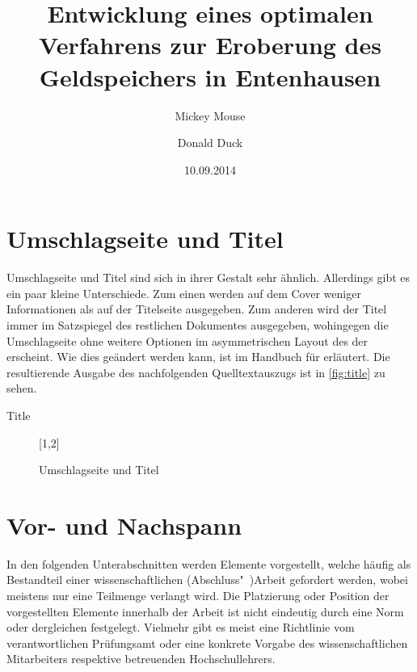 \documentclass[%
  english,ngerman,%
  geometry=no,DIV=12,automark,%
]{tudscrartcl}
\begin{document}
\section{Umschlagseite und Titel}
Umschlagseite und Titel sind sich in ihrer Gestalt sehr ähnlich. Allerdings 
gibt es ein paar kleine Unterschiede. Zum einen werden auf dem Cover weniger 
Informationen als auf der Titelseite ausgegeben. Zum anderen wird der Titel 
immer im Satzspiegel des restlichen Dokumentes ausgegeben, wohingegen die 
Umschlagseite ohne weitere Optionen im asymmetrischen Layout des \CDs der \TnUD 
erscheint. Wie dies geändert werden kann, ist im Handbuch für  
erläutert. Die resultierende Ausgabe des nachfolgenden Quelltextauszugs ist in 
\autoref{fig:title} zu sehen.
%
\begin{Excerpt!}{Title}
\title{%
  Entwicklung eines optimalen Verfahrens zur Eroberung des
  Geldspeichers in Entenhausen
}
\author{%
  Mickey Mouse
  \and%
  Donald Duck
}
\date{10.09.2014}
\makecover
\maketitle
\end{Excerpt!}
%
\begin{figure}
[1,2]
\caption{Umschlagseite und Titel}
\label{fig:title}
\end{figure}



\section{Vor- und Nachspann}
In den folgenden Unterabschnitten werden Elemente vorgestellt, welche häufig 
als Bestandteil einer wissenschaftlichen (Abschluss"~)Arbeit gefordert werden, 
wobei meistens nur eine Teilmenge verlangt wird. Die Platzierung oder Position 
der vorgestellten Elemente innerhalb der Arbeit ist nicht eindeutig durch eine 
Norm oder dergleichen festgelegt. Vielmehr gibt es meist eine Richtlinie vom 
verantwortlichen Prüfungsamt oder eine konkrete Vorgabe des wissenschaftlichen 
Mitarbeiters respektive betreuenden Hochschullehrers.
\end{document}
